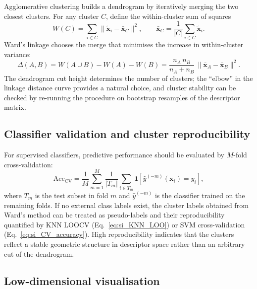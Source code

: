 \documentclass[journal=jacsat,manuscript=article]{achemso}
\begin{document}
Agglomerative clustering builds a dendrogram by iteratively merging
the two closest clusters. For any cluster $C$, define the within-cluster
sum of squares
\begin{equation}
	W(C)
	=
	\sum_{i \in C}
	\|\tilde{\mathbf{x}}_i - \bar{\mathbf{x}}_C\|^2,
	\qquad
	\bar{\mathbf{x}}_C = \frac{1}{|C|}\sum_{i \in C} \tilde{\mathbf{x}}_i.
	\label{eq:si_Ward_within}
\end{equation}
Ward's linkage chooses the merge that minimises the increase in
within-cluster variance:
\begin{equation}
	\Delta(A,B)
	=
	W(A\cup B) - W(A) - W(B)
	=
	\frac{n_A\, n_B}{n_A + n_B}\,
	\|\bar{\mathbf{x}}_A - \bar{\mathbf{x}}_B\|^2.
	\label{eq:si_Ward}
\end{equation}
The dendrogram cut height determines the number of clusters; the
``elbow'' in the linkage distance curve provides a natural choice, and
cluster stability can be checked by re-running the procedure on
bootstrap resamples of the descriptor matrix.

\subsection{Classifier validation and cluster reproducibility}
\label{sec:si_cv}

For supervised classifiers, predictive performance should be evaluated by
$M$-fold cross-validation:
\begin{equation}
	\mathrm{Acc}_{\mathrm{CV}}
	=
	\frac{1}{M}
	\sum_{m=1}^{M}
	\frac{1}{|T_m|}
	\sum_{i \in T_m}
	\mathbf{1}\!\left[
	\hat{y}^{(-m)}(\mathbf{x}_i) = y_i
	\right],
	\label{eq:si_CV_accuracy}
\end{equation}
where $T_m$ is the test subset in fold $m$ and $\hat{y}^{(-m)}$ is the
classifier trained on the remaining folds. If no external class labels
exist, the cluster labels obtained from Ward's method can be treated as
pseudo-labels and their reproducibility quantified by KNN LOOCV
(Eq.~\eqref{eq:si_KNN_LOO}) or SVM cross-validation
(Eq.~\eqref{eq:si_CV_accuracy}). High reproducibility indicates that the
clusters reflect a stable geometric structure in descriptor space rather
than an arbitrary cut of the dendrogram.

\subsection{Low-dimensional visualisation}
\label{sec:si_PCA}
\end{document}
